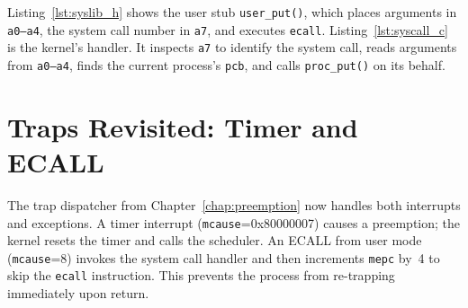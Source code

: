 Listing~\ref{lst:syslib_h} shows the user stub \texttt{user\_put()}, which
places arguments in \texttt{a0--a4}, the system call number in \texttt{a7}, and
executes \texttt{ecall}.  Listing~\ref{lst:syscall_c} is the kernel’s handler.
It inspects \texttt{a7} to identify the system call, reads arguments from
\texttt{a0--a4}, finds the current process’s \texttt{pcb}, and calls
\texttt{proc\_put()} on its behalf.

\begin{figure}[H]
\centering

\end{figure}

\begin{figure}[H]
\centering

\end{figure}

\begin{figure}[H]
\centering

\end{figure}

\section{Traps Revisited: Timer and ECALL}

The trap dispatcher from Chapter~\ref{chap:preemption} now handles both
interrupts and exceptions.  A timer interrupt (\texttt{mcause}=0x80000007)
causes a preemption; the kernel resets the timer and calls the scheduler.
An ECALL from user mode (\texttt{mcause}=8) invokes the system call handler and
then increments \texttt{mepc} by~4 to skip the \texttt{ecall} instruction.
This prevents the process from re-trapping immediately upon return.

\begin{figure}[H]
\centering

\end{figure}

\begin{figure}[H]
\centering

\end{figure}

